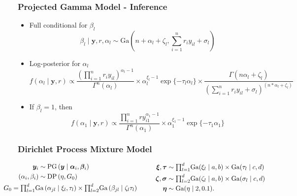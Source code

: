 \documentclass[aspectratio=169]{beamer}
\begin{document}
\begin{frame}
  \frametitle{Projected Gamma Model - Inference}
  \begin{itemize}
    \item Full conditional for $\beta_l$
      \begin{equation*}
        \beta_l\mid \bm{ y}, r, \alpha_l \sim \text{Ga}\left(n + \alpha_l + \zeta_l,
                {\textstyle \sum}_{i = 1}^nr_iy_{il} + \sigma_l\right)
      \end{equation*}
    \pause
    \item Log-posterior for $\alpha_l$
      \begin{equation*}
        f(\alpha_l \mid \bm{ y}, r) \propto
          \frac{\left({\textstyle \prod}_{i = 1}^nr_iy_{il}\right)^{\alpha_l - 1}}{
            \Gamma^n(\alpha_l)} \times \alpha_l^{\xi_l - 1}\exp\{-\tau_l\alpha_l\} \times
            \frac{\Gamma(n\alpha_l + \zeta_l)}{
            \left({\textstyle\sum}_{i = 1}^n r_iy_{il} + \sigma_l
                  \right)^{(n * \alpha_l + \zeta_l)}}
      \end{equation*}
    \pause
    \item If $\beta_l = 1$, then
    \begin{equation*}
      f(\alpha_1 \mid \bm{ y}, r) \propto
        \frac{{\textstyle\prod}_{i = 1}^n ry_{i1}^{\alpha_1 - 1}}{\Gamma^n(\alpha_1)} \times
        \alpha_1^{\xi_1 - 1}\exp\{-\tau_1\alpha_1\}
    \end{equation*}
  \end{itemize}
\end{frame}

\begin{frame}
  \frametitle{Dirichlet Process Mixture Model}
  \begin{equation*}
    \begin{aligned}
      \bm{ y}_i &\sim \text{PG}\left(\bm{ y}\mid \bm{ \alpha}_i, \bm{ \beta}_i\right)\\
      (\alpha_i,\beta_i) &\sim \text{DP}\left(\eta, G_0\right)\\
      &~\hspace{-2cm}G_0 = {\textstyle\prod}_{l = 1}^d\text{Ga}\left(\alpha_{jl}\mid\xi_{l},\tau_{l}\right)
                    \times{\textstyle\prod}_{l=2}^d\text{Ga}\left(\beta_{jl}\mid\zeta_{l}\tau_{l}\right)
    \end{aligned}
    \hspace{1cm}
    \begin{aligned}
      \bm{ \xi},\bm{ \tau} &\sim {\textstyle \prod}_{l = 1}^d \text{Ga}(\xi_l\mid a,b)
              \times \text{Ga}(\tau_l\mid c,d)\\
      \bm{ \zeta},\bm{\sigma} &\sim {\textstyle\prod}_{l = 2}^d\text{Ga}(\zeta_l \mid a,b)
              \times \text{Ga}(\sigma_l\mid c,d)\\
      \bm{ \eta} &\sim \text{Ga}(\eta \mid 2, 0.1).
    \end{aligned}
  \end{equation*}
\end{frame}
\end{document}
